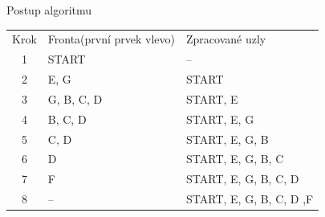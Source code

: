 \documentclass{beamer}
\begin{document}
\begin{frame}{Postup algoritmu}
    \begin{center}
        \begin{tabular}{ c l l }
             Krok & Fronta(první prvek vlevo) & Zpracované uzly \\ 
             1 & START & -- \\  
             2 & E, G & START \\   
             3 & G, B, C, D & START, E \\  
             4 & B, C, D & START, E, G \\  
             5 & C, D & START, E, G, B \\  
             6 & D & START, E, G, B, C \\  
             7 & F & START, E, G, B, C, D \\  
             8 & -- & \alert{START, E, G, B, C, D ,F} \\  
        \end{tabular}
    \end{center}
\end{frame}
\end{document}
